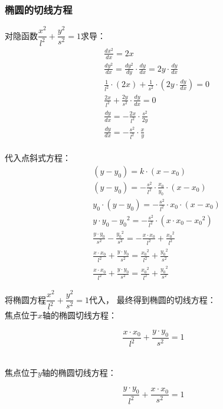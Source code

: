 \documentclass[UTF8]{ctexart}
\begin{document}
\subsubsection{椭圆的切线方程}
    对隐函数$\dfrac{x^2}{l^2}+\dfrac{y^2}{s^2}=1$求导：
    \setcounter{equation}{0}
    \begin{align}
        &\frac{dx^2}{dx}=2x\\[4mm]
        &\frac{dy^2}{dx}=\frac{dy^2}{dy}\cdot\frac{dy}{dx}=2y\cdot\frac{dy}{dx}\\[6mm]
        &\frac{1}{l^2}\cdot(2x)+\frac{1}{s^2}\cdot(2y\cdot\frac{dy}{dx})=0\\[5mm]
        &\frac{2x}{l^2}+\frac{2y}{s^2}\cdot\frac{dy}{dx}=0\\[4mm]
        &\frac{dy}{dx}=-\frac{2x}{l^2}\cdot\frac{s^2}{2y}\\[4mm]
        &\frac{dy}{dx}=-\frac{s^2}{l^2}\cdot\frac{x}{y}
    \end{align}\\
    代入点斜式方程：
    \begin{align}
        &(y-y_0)=k\cdot(x-x_0)\\[4mm]
        &(y-y_0)=-\frac{s^2}{l^2}\cdot\frac{x_0}{y_0}\cdot(x-x_0)\\[4mm]
        &y_0\cdot(y-y_0)=-\frac{s^2}{l^2}\cdot x_0\cdot(x-x_0)\\[4mm]
        &y\cdot y_0-{y_0}^2=-\frac{s^2}{l^2}\cdot(x\cdot x_0-{x_0}^2)\\[4mm]
        &\frac{y\cdot y_0}{s^2}-\frac{{y_0}^2}{s^2}=-\frac{x\cdot x_0}{l^2}+\frac{{x_0}^2}{l^2}\\[6mm]
        &\frac{x\cdot x_0}{l^2}+\frac{y\cdot y_0}{s^2}=\frac{{x_0}^2}{l^2}+\frac{{y_0}^2}{s^2}\\[6mm]
        &\frac{x\cdot x_0}{l^2}+\frac{y\cdot y_0}{s^2}=\frac{{x_0}^2}{l^2}+\frac{{y_0}^2}{s^2}
    \end{align}

\newpage

    将椭圆方程$\dfrac{x^2}{l^2}+\dfrac{y^2}{s^2}=1$代入，
    最终得到椭圆的切线方程：\\[4mm]
    焦点位于$x$轴的椭圆切线方程：
    \begin{large}
        \begin{equation*}
            \frac{x \cdot x_0}{l^2}+\frac{y \cdot y_0}{s^2}=1
        \end{equation*}
    \end{large}\\
    焦点位于$y$轴的椭圆切线方程：
    \begin{large}
        \begin{equation*}
            \frac{y \cdot y_0}{l^2}+\frac{x \cdot x_0}{s^2}=1
        \end{equation*}
    \end{large}\\
\end{document}
